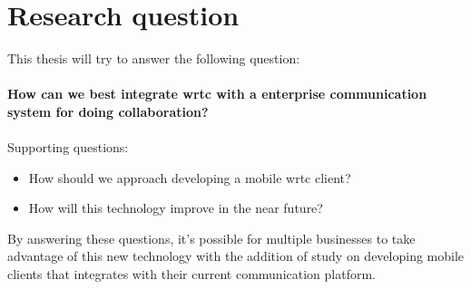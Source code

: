 



\section{Research question}
This thesis will try to answer the following question:
\\
\\
\textbf{How can we best integrate \gls{wrtc} with a enterprise communication system for doing collaboration?}
\\
\\
Supporting questions:

\begin{itemize}
    \item How should we approach developing a mobile \gls{wrtc} client?
    \item How will this technology improve in the near future?
\end{itemize}

By answering these questions, it's possible for multiple businesses to take advantage of this new technology with the addition of study on developing mobile clients that integrates with their current communication platform.

